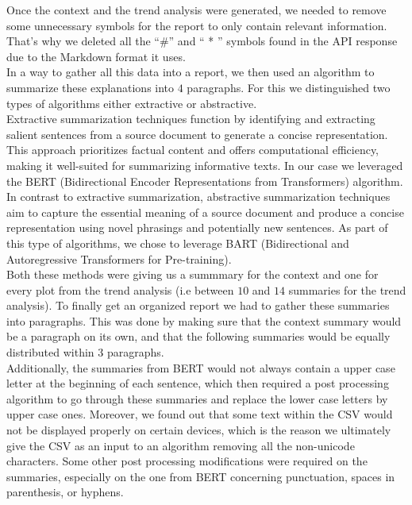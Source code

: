 \documentclass[preprint,12pt]{elsarticle}
\begin{document}
Once the context and the trend analysis were generated, we needed to remove some unnecessary symbols for the report to only contain relevant information. That’s why we deleted all the “\#” and “ * ” symbols found in the API response due to the Markdown format it uses.\\

In a way to gather all this data into a report, we then used an algorithm to summarize these explanations into $4$ paragraphs. For this we distinguished two types of algorithms either extractive or abstractive. \\

Extractive summarization techniques function by identifying and extracting salient sentences from a source document to generate a concise representation. This approach prioritizes factual content and offers computational efficiency, making it well-suited for summarizing informative texts. In our case we leveraged the BERT \cite{Miller2019}(Bidirectional Encoder Representations from Transformers) algorithm.  \\

In contrast to extractive summarization, abstractive summarization techniques aim to capture the essential meaning of a source document and produce a concise representation using novel phrasings and potentially new sentences. As part of this type of algorithms, we chose to leverage BART \cite{Lewis2020} (Bidirectional and Autoregressive Transformers for Pre-training). \\

Both these methods were giving us a summmary for the context and one for every plot from the trend analysis (i.e between $10$ and $14$ summaries for the trend analysis). To finally get an organized report we had to gather these summaries into paragraphs. This was done by making sure that the context summary would be a paragraph on its own, and that the following summaries would be equally distributed within $3$ paragraphs.\\

Additionally, the summaries from BERT would not always contain a upper case letter at the beginning of each sentence, which then required a post processing algorithm to go through these summaries and replace the lower case letters by upper case ones. Moreover, we found out that some text within the CSV would not be displayed properly on certain devices, which is the reason we ultimately give the CSV as an input to an algorithm removing all the non-unicode characters. Some other post processing modifications were required on the summaries, especially on the one from BERT concerning punctuation, spaces in parenthesis, or hyphens. \\
\end{document}
